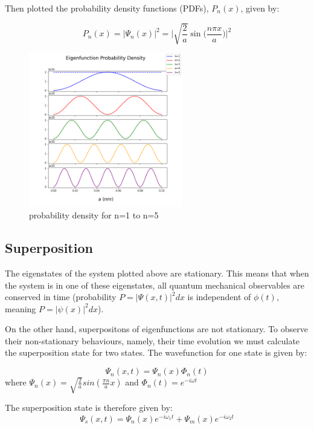 Then plotted the probability density functions (PDFs), $P_n (x)$, given by:

$$P_n(x) = |\Psi_n(x)|^{2} = \Bigg|\sqrt{\frac{2}{a}}\sin\Big(\frac{n\pi x}{a}\Big)\Bigg|^{2}  $$

\begin{figure}[h]
    \centering
    \includegraphics[width=0.6\textwidth]{lab1/images/probabilityDensity.png} %
    \caption{probability density for n=1 to n=5}
    \label{fig:probDens}
\end{figure}

\subsection{Superposition}

The eigenstates of the system plotted above are stationary. This means that when the system is in one of these eigenstates, all quantum mechanical observables are conserved in time (probability $P=|\Psi(x,t)|^2dx$ is independent of $\phi(t)$, meaning $P=|\psi(x)|^2dx$).

On the other hand, superpositons of eigenfunctions are not stationary. To observe their non-stationary behaviours, namely, their time evolution we must calculate the superposition state for two states. The wavefunction for one state is given by:

$$\Psi_n (x,t) = \Psi_n (x)\Phi_n (t)$$
where $\Psi_n (x)= \sqrt{\frac{2}{a}} sin(\frac{\pi n}{a}x)$ and $\Phi_n (t)= e^{-i \omega t}$

The superposition state is therefore given by:
\begin{equation} \label{eq:superPos}
\Psi_s (x,t) = \Psi_n (x)e^{-i \omega_{1} t} + \Psi_m (x)e^{-i \omega_{2} t}
\end{equation}


